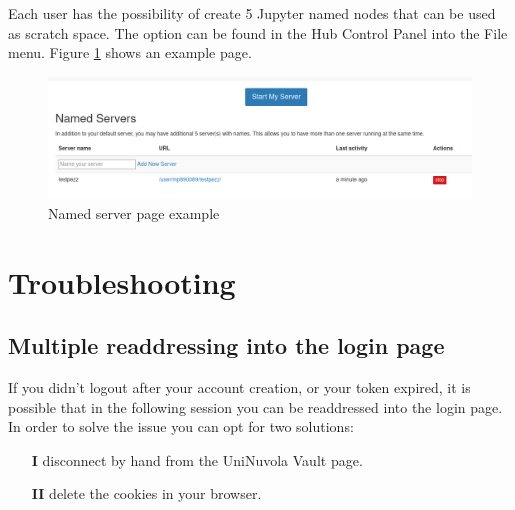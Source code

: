 Each user has the possibility of create 5 Jupyter  named nodes that can be used as scratch space. The option can be
found in the Hub Control Panel into the File menu. Figure \ref{fig:uninuvola_multi} shows an example page.

\begin{figure}[!ht]
    \centering
    \includegraphics[width=0.90\linewidth]{img/multiserver.png}
    \caption{Named server page example}
    \label{fig:uninuvola_multi}
\end{figure}


\section{Troubleshooting}
\subsection{Multiple readdressing into the login page}
If you didn't logout after your account creation, or your token expired, it is possible that in the following session
you can be readdressed into the login page.  In order to solve the issue you can opt for two solutions:
\begin{itemize}
    \item[\textbf{I}] disconnect by hand from the UniNuvola Vault page.
    \item[\textbf{II}] delete the cookies in your browser.
\end{itemize}

